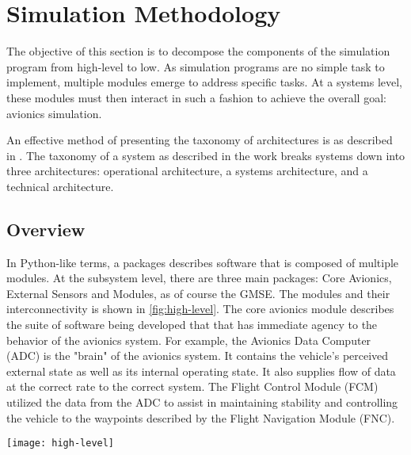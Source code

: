 \section{Simulation Methodology}
\label{sec:sim-method}

The objective of this section is to decompose the components of the simulation program from
high-level to low. As simulation programs are no simple task to implement, multiple modules emerge
to address specific tasks. At a systems level, these modules must then interact in such a fashion to
achieve the overall goal: avionics simulation.

An effective method of presenting the taxonomy of architectures is as described in
\cite{levis_c4isr_2000}. The taxonomy of a system as described in the work breaks systems down into
three architectures: operational architecture, a systems architecture, and a technical architecture.

\subsection{Overview}
In Python-like terms, a packages describes software that is composed of multiple modules. At the
subsystem level, there are three main packages: Core Avionics, External Sensors and Modules, as of
course the GMSE. The modules and their interconnectivity is shown in \autoref{fig:high-level}. The
core avionics module describes the suite of software being developed that that has immediate agency
to the behavior of the avionics system. For example, the Avionics Data Computer (ADC) is the "brain"
of the avionics system. It contains the vehicle's perceived external state as well as its internal
operating state. It also supplies flow of data at the correct rate to the correct system. The Flight
Control Module (FCM) utilized the data from the ADC to assist in maintaining stability and
controlling the vehicle to the waypoints described by the Flight Navigation Module (FNC).

\begin{figure*}
\texttt{[image: high-level]}
\caption{}
\label{fig:high-level}
\end{figure*}
